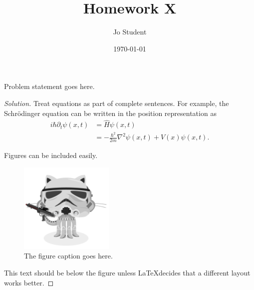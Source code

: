 \documentclass[aps,pra,notitlepage,amsmath,amssymb,letterpaper,12pt]{revtex4-1}
\newenvironment{problem}[2][Problem]{\begin{trivlist}
\item[\hskip \labelsep {\bfseries #1}\hskip \labelsep {\bfseries #2.}]}{\end{trivlist}}
\newenvironment{solution}{\begin{proof}[Solution]}{\end{proof}}
\begin{document}
 
\title{Homework X}
\author{Jo Student}
\date{\today}

\maketitle

\begin{problem}{x.yz} 
Problem statement goes here.
\end{problem}
 
\begin{solution} %
Treat equations as part of complete sentences.  For example, the Schr\"odinger equation can be written in the position representation as
\begin{align}
i\hbar \partial_t \psi(x,t) & = \hat{H}\psi(x,t) \\
& = -\frac{\hbar^2}{2m}\nabla^2\psi(x,t) + V(x)\psi(x,t). \nonumber %
\end{align}

Figures can be included easily.

\begin{figure}[h!] %
  \includegraphics[width=0.4\textwidth]{stormtroopocat.jpg}  %
  \caption{The figure caption goes here.}
  \label{fig:figlabel}
\end{figure}

This text should be below the figure unless \LaTeX decides that a different layout works better.
\end{solution}
 
 
 
\end{document}
